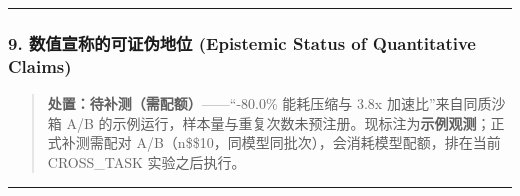 \begin{Shaded}
\begin{Highlighting}[]
      \OperatorTok{=}  \NormalTok{)}\OperatorTok{;}

\NormalTok{(\{}
\OperatorTok{:}\OperatorTok{,}
\OperatorTok{:}\OperatorTok{,}
\OperatorTok{:}\OperatorTok{,}
\OperatorTok{:}\OperatorTok{,}
\OperatorTok{:}
\NormalTok{      \})}\OperatorTok{;}
\NormalTok{    \}}

     \OperatorTok{;}
\NormalTok{  \}}
\NormalTok{\}}
\end{Highlighting}
\end{Shaded}

\begin{center}\rule{0.5\linewidth}{0.5pt}\end{center}

\subsubsection{9. 数值宣称的可证伪地位 (Epistemic Status of Quantitative
Claims)}\label{ux6570ux503cux5ba3ux79f0ux7684ux53efux8bc1ux4f2aux5730ux4f4d-epistemic-status-of-quantitative-claims-5}

\begin{quote}
\textbf{处置：待补测（需配额）}------``-80.0\% 能耗压缩与 3.8x
加速比''来自同质沙箱 A/B
的示例运行，样本量与重复次数未预注册。现标注为\textbf{示例观测}；正式补测需配对
A/B（n\$\ge\$10，同模型同批次），会消耗模型配额，排在当前 CROSS\_TASK
实验之后执行。
\end{quote}

\begin{center}\rule{0.5\linewidth}{0.5pt}\end{center}

